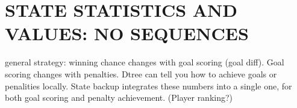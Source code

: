 \documentclass[]{article}
\begin{document}
%

\section{STATE STATISTICS AND VALUES: NO SEQUENCES}

general strategy: winning chance changes with goal scoring (goal diff). Goal scoring changes with penalties.  Dtree can tell you how to achieve goals or penalities locally. State backup integrates these numbers into a single one, for both goal scoring and penalty achievement. (Player ranking?)
\end{document}
